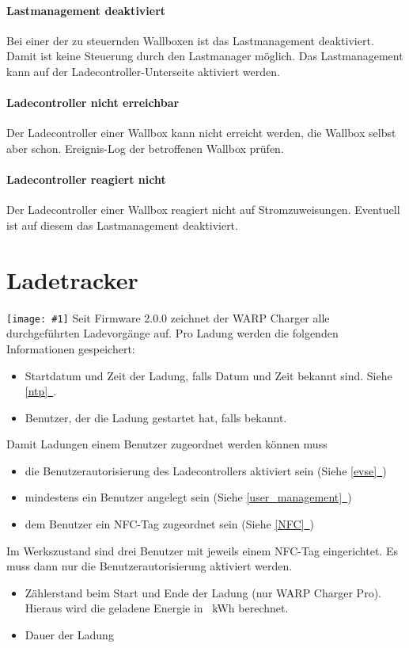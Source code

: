 \documentclass[a4paper,10pt]{article}
\newcommand{\hint}[1]{\begin{tcolorbox}[colback=boxgray,colframe=black,coltext=
white,title=Hinweis,left*=2mm,right*=2mm,boxsep=1mm,bottom=1mm,top=1mm]#1\end{tcolorbox}}
\newcommand{\gfx}[1]{\texttt{[image: \#1]}}
\newcommand*{\fullref}[1]{\hyperref[{#1}]{\ref*{#1}~\nameref*{#1}}}
\begin{document}
\begin{multicols*}{2}
	\paragraph{Lastmanagement deaktiviert}
	Bei einer der zu steuernden Wallboxen ist das Lastmanagement deaktiviert. Damit ist keine Steuerung durch den Lastmanager möglich. Das Lastmanagement kann auf der Ladecontroller-Unterseite aktiviert werden.

	\paragraph{Ladecontroller nicht erreichbar}
	Der Ladecontroller einer Wallbox kann nicht erreicht werden, die Wallbox selbst aber schon. Ereignis-Log der betroffenen Wallbox prüfen.

	\paragraph{Ladecontroller reagiert nicht}
	Der Ladecontroller einer Wallbox reagiert nicht auf Stromzuweisungen. Eventuell ist auf diesem das Lastmanagement deaktiviert.

	\newpage
	\section{Ladetracker}
	\gfx{./img_warp2/resized/web_charge_tracker}
	Seit Firmware 2.0.0 zeichnet der WARP Charger alle durchgeführten Ladevorgänge auf. Pro Ladung werden die folgenden Informationen gespeichert:
	\begin{itemize}
	 \item Startdatum und Zeit der Ladung, falls Datum und Zeit bekannt sind. Siehe \fullref{ntp}.
	 \item Benutzer, der die Ladung gestartet hat, falls bekannt.
	\end{itemize}
	\hint{Damit Ladungen einem Benutzer zugeordnet werden können muss
		\begin{itemize}
			\item die Benutzerautorisierung des Ladecontrollers aktiviert sein (Siehe \fullref{evse})
			\item mindestens ein Benutzer angelegt sein (Siehe \fullref{user_management})
			\item dem Benutzer ein NFC-Tag zugeordnet sein (Siehe \fullref{NFC})
		\end{itemize}
		Im Werkszustand sind drei Benutzer mit jeweils einem NFC-Tag eingerichtet. Es muss dann nur die Benutzerautorisierung aktiviert werden.
	}
	\begin{itemize}
	 \item Zählerstand beim Start und Ende der Ladung (nur WARP Charger Pro). Hieraus wird die geladene Energie in \SI{}{\kWh} berechnet.
	 \item Dauer der Ladung
	\end{itemize}


\end{multicols*}
\end{document}
